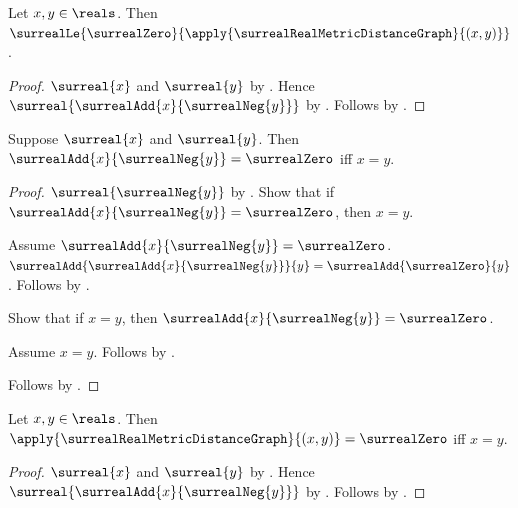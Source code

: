 \begin{proposition}\label{surreal_real_metric_distance_nonnegative}
    Let $x,y\in\reals$.
    Then
        $\surrealLe{\surrealZero}
            {\apply{\surrealRealMetricDistanceGraph}{(x,y)}}$.
\end{proposition}
\begin{proof}
    $\surreal{x}$ and $\surreal{y}$
        by .
    Hence $\surreal{\surrealAdd{x}{\surrealNeg{y}}}$
        by .
    Follows by
        .
\end{proof}

\begin{proposition}\label{surreal_real_difference_zero_iff}
    Suppose $\surreal{x}$ and $\surreal{y}$.
    Then
        $\surrealAdd{x}{\surrealNeg{y}}=\surrealZero$ iff $x=y$.
\end{proposition}
\begin{proof}
    $\surreal{\surrealNeg{y}}$
        by .
    Show that if
        $\surrealAdd{x}{\surrealNeg{y}}=\surrealZero$, then $x=y$.
    \begin{subproof}
        Assume $\surrealAdd{x}{\surrealNeg{y}}=\surrealZero$.
        $\surrealAdd{\surrealAdd{x}{\surrealNeg{y}}}{y}
            =\surrealAdd{\surrealZero}{y}$.
        Follows by
            .
    \end{subproof}
    Show that if $x=y$, then
        $\surrealAdd{x}{\surrealNeg{y}}=\surrealZero$.
    \begin{subproof}
        Assume $x=y$.
        Follows by
            .
    \end{subproof}
    Follows by \auto.
\end{proof}

\begin{proposition}\label{surreal_real_metric_distance_zero_iff}
    Let $x,y\in\reals$.
    Then
        $\apply{\surrealRealMetricDistanceGraph}{(x,y)}=\surrealZero$
        iff $x=y$.
\end{proposition}
\begin{proof}
    $\surreal{x}$ and $\surreal{y}$
        by .
    Hence $\surreal{\surrealAdd{x}{\surrealNeg{y}}}$
        by .
    Follows by
        .
\end{proof}

